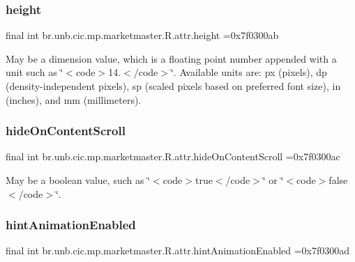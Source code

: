\subsubsection{\texorpdfstring{height}{height}}
{\footnotesize\ttfamily final int br.\+unb.\+cic.\+mp.\+marketmaster.\+R.\+attr.\+height =0x7f0300ab\hspace{0.3cm}{\ttfamily [static]}}

May be a dimension value, which is a floating point number appended with a unit such as \char`\"{}$<$code$>$14.\+5sp$<$/code$>$\char`\"{}. Available units are\+: px (pixels), dp (density-\/independent pixels), sp (scaled pixels based on preferred font size), in (inches), and mm (millimeters). \mbox{\label{classbr_1_1unb_1_1cic_1_1mp_1_1marketmaster_1_1R_1_1attr_a3b9a9880d1f40a72c2c6372f11e78a33}} 
\subsubsection{\texorpdfstring{hide\+On\+Content\+Scroll}{hideOnContentScroll}}
{\footnotesize\ttfamily final int br.\+unb.\+cic.\+mp.\+marketmaster.\+R.\+attr.\+hide\+On\+Content\+Scroll =0x7f0300ac\hspace{0.3cm}{\ttfamily [static]}}

May be a boolean value, such as \char`\"{}$<$code$>$true$<$/code$>$\char`\"{} or \char`\"{}$<$code$>$false$<$/code$>$\char`\"{}. \mbox{\label{classbr_1_1unb_1_1cic_1_1mp_1_1marketmaster_1_1R_1_1attr_a301d42c972c792b5d374f0f32c1d2e5a}} 
\subsubsection{\texorpdfstring{hint\+Animation\+Enabled}{hintAnimationEnabled}}
{\footnotesize\ttfamily final int br.\+unb.\+cic.\+mp.\+marketmaster.\+R.\+attr.\+hint\+Animation\+Enabled =0x7f0300ad\hspace{0.3cm}{\ttfamily [static]}}

